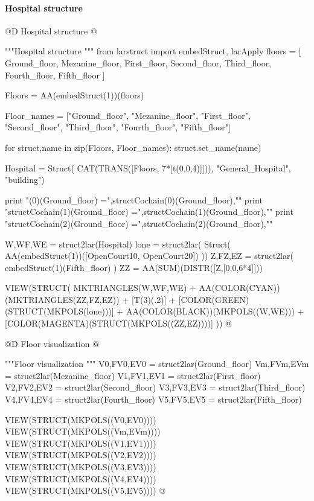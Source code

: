 \documentclass[11pt,oneside]{article}    %
\begin{document}
\paragraph{Hospital structure}
@D Hospital structure
@{"""Hospital structure """
from larstruct import embedStruct, larApply
floors = [ Ground_floor, Mezanine_floor, First_floor, 
    Second_floor, Third_floor, Fourth_floor, Fifth_floor ]

Floors = AA(embedStruct(1))(floors)

Floor_names = ["Ground_floor", "Mezanine_floor", "First_floor", 
					"Second_floor", "Third_floor", "Fourth_floor", "Fifth_floor"] 
										
for struct,name in zip(Floors, Floor_names): struct.set_name(name)

Hospital = Struct( CAT(TRANS([Floors, 7*[t(0,0,4)]])), "General_Hospital", "building")

print "\nstructCochain(0)(Ground_floor) =",structCochain(0)(Ground_floor),"\n"
print "structCochain(1)(Ground_floor) =",structCochain(1)(Ground_floor),"\n"
print "structCochain(2)(Ground_floor) =",structCochain(2)(Ground_floor),"\n"

W,WF,WE = struct2lar(Hospital)
lone = struct2lar( Struct( AA(embedStruct(1))([OpenCourt10, OpenCourt20]) ))
Z,FZ,EZ = struct2lar( embedStruct(1)(Fifth_floor) )
ZZ = AA(SUM)(DISTR([Z,[0,0,6*4]]))

VIEW(STRUCT( MKTRIANGLES(W,WF,WE) + AA(COLOR(CYAN))(MKTRIANGLES(ZZ,FZ,EZ)) + [T(3)(.2)] + [COLOR(GREEN)(STRUCT(MKPOLS(lone)))] + AA(COLOR(BLACK))(MKPOLS((W,WE))) + [COLOR(MAGENTA)(STRUCT(MKPOLS((ZZ,EZ))))] ))
@}


@D Floor visualization
@{"""Floor visualization """
V0,FV0,EV0 = struct2lar(Ground_floor)
Vm,FVm,EVm = struct2lar(Mezanine_floor)
V1,FV1,EV1 = struct2lar(First_floor)
V2,FV2,EV2 = struct2lar(Second_floor)
V3,FV3,EV3 = struct2lar(Third_floor)
V4,FV4,EV4 = struct2lar(Fourth_floor)
V5,FV5,EV5 = struct2lar(Fifth_floor)

VIEW(STRUCT(MKPOLS((V0,EV0))))
VIEW(STRUCT(MKPOLS((Vm,EVm))))
VIEW(STRUCT(MKPOLS((V1,EV1))))
VIEW(STRUCT(MKPOLS((V2,EV2))))
VIEW(STRUCT(MKPOLS((V3,EV3))))
VIEW(STRUCT(MKPOLS((V4,EV4))))
VIEW(STRUCT(MKPOLS((V5,EV5))))
@}
\end{document}
